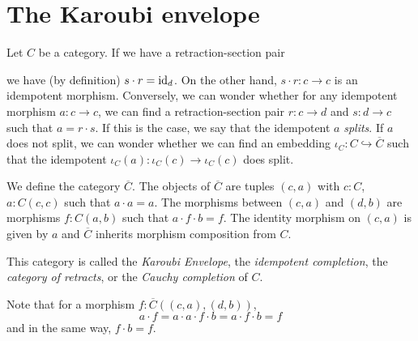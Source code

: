 \section{The Karoubi envelope}
Let $ C $ be a category. If we have a retraction-section pair
we have (by definition) $ s \cdot r = \text{id}_{d} $. On the other hand, $ s \cdot r: c \to c $ is an idempotent morphism. Conversely, we can wonder whether for any idempotent morphism $ a: c \to c $, we can find a retraction-section pair $ r: c \to d $ and $ s: d \to c $ such that $ a = r \cdot s $. If this is the case, we say that the idempotent $ a $ \textit{splits}. If $ a $ does not split, we can wonder whether we can find an embedding $ \iota_C : C \hookrightarrow \overline C $ such that the idempotent $ \iota_C(a): \iota_C(c) \to \iota_C(c) $ does split.

\begin{definition}
  We define the category $ \overline C $. The objects of $ \overline C $ are tuples $ (c, a) $ with $ c: C $, $ a: C(c, c) $ such that $ a \cdot a = a $. The morphisms between $ (c, a) $ and $ (d, b) $ are morphisms $ f: C(a, b) $ such that $ a \cdot f \cdot b = f $. The identity morphism on $ (c, a) $ is given by $ a $ and $ \overline C $ inherits morphism composition from $ C $.
\end{definition}
This category is called the \textit{Karoubi Envelope}, the \textit{idempotent completion}, the \textit{category of retracts}, or the \textit{Cauchy completion} of $ C $.




\begin{remark}
  Note that for a morphism $ f: \overline C((c, a), (d, b)) $,
  \[ a \cdot f = a \cdot a \cdot f \cdot b = a \cdot f \cdot b = f \]
  and in the same way, $ f \cdot b = f $.
\end{remark}

